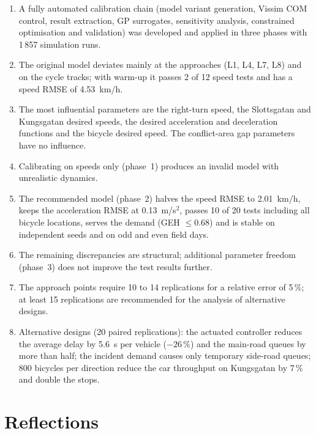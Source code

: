\documentclass[11pt,a4paper]{article}
\newcommand{\kmh}{~km/h}
\newcommand{\mss}{~m/s$^2$}
\begin{document}
\begin{enumerate}
  \item A fully automated calibration chain (model variant generation, Vissim COM control, result
        extraction, GP surrogates, sensitivity analysis, constrained optimisation and validation)
        was developed and applied in three phases with 1\,857 simulation runs.
  \item The original model deviates mainly at the approaches (L1, L4, L7, L8) and on the cycle
        tracks; with warm-up it passes 2 of 12 speed tests and has a speed RMSE of 4.53\kmh.
  \item The most influential parameters are the right-turn speed, the Slottsgatan and Kungsgatan
        desired speeds, the desired acceleration and deceleration functions and the bicycle desired
        speed. The conflict-area gap parameters have no influence.
  \item Calibrating on speeds only (phase~1) produces an invalid model with unrealistic dynamics.
  \item The recommended model (phase~2) halves the speed RMSE to 2.01\kmh, keeps the acceleration
        RMSE at 0.13\mss, passes 10 of 20 tests including all bicycle locations, serves the demand
        (GEH $\le 0.68$) and is stable on independent seeds and on odd and even field days.
  \item The remaining discrepancies are structural; additional parameter freedom (phase~3) does not
        improve the test results further.
  \item The approach points require 10 to 14 replications for a relative error of 5\,\%; at least
        15 replications are recommended for the analysis of alternative designs.
  \item Alternative designs (20 paired replications): the actuated controller reduces the average
        delay by 5.6~s per vehicle ($-26\,\%$) and the main-road queues by more than half; the
        incident demand causes only temporary side-road queues; 800 bicycles per direction reduce
        the car throughput on Kungsgatan by 7\,\% and double the stops.
\end{enumerate}

\section{Reflections}
\label{sec:reflections}
\end{document}
